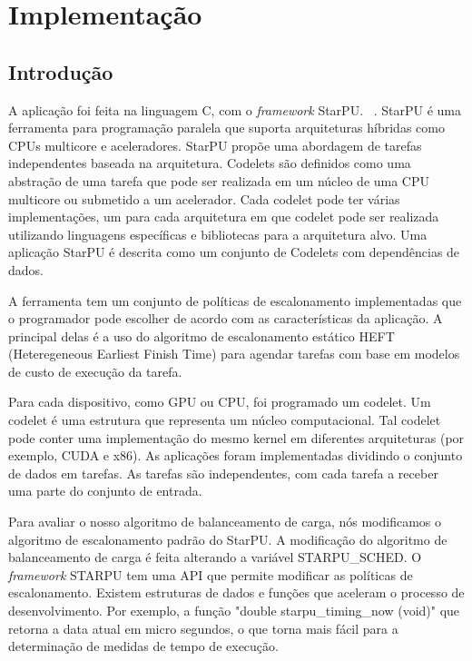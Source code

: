 \pagestyle{empty}
\cleardoublepage
\pagestyle{fancy}

\chapter{Implementação}\label{cap5}

\section{Introdução}\label{cap5:intro}

A aplicação foi feita na linguagem C, com o \emph{framework} StarPU. ~\cite{starpu}. StarPU  é uma ferramenta para programação paralela que suporta 
arquiteturas híbridas como CPUs multicore e aceleradores.  StarPU propõe 
uma abordagem de tarefas independentes baseada na arquitetura. Codelets são definidos como uma  abstração de uma tarefa que pode ser realizada em um núcleo de uma CPU multicore ou 
submetido a um acelerador. Cada codelet pode ter várias implementações, um 
para cada arquitetura em que codelet pode ser realizada utilizando linguagens específicas 
e bibliotecas para a arquitetura alvo. Uma aplicação StarPU é descrita como  
um conjunto de Codelets com dependências de dados. 

A ferramenta tem um conjunto de políticas de escalonamento implementadas que o programador pode 
escolher de acordo com as características da aplicação. A principal delas é a 
uso do algoritmo de escalonamento estático HEFT (Heteregeneous Earliest Finish Time) para 
agendar tarefas com base em modelos de custo de execução da tarefa. 

Para cada dispositivo, como GPU ou CPU, foi programado um codelet. Um codelet é uma estrutura que representa um núcleo computacional. Tal codelet pode conter uma implementação do mesmo kernel em diferentes 
arquiteturas (por exemplo, CUDA e x86). As aplicações foram implementadas  
dividindo o conjunto de dados em tarefas. As tarefas são 
independentes, com cada tarefa a receber uma parte do conjunto de entrada. 

Para avaliar o nosso algoritmo de balanceamento de carga, nós modificamos o algoritmo de escalonamento padrão do StarPU. A modificação do algoritmo de balanceamento de carga é feita alterando a variável STARPU\_SCHED. O \emph{framework} STARPU tem uma API que permite modificar as políticas de escalonamento. Existem estruturas de dados e funções que aceleram o processo de desenvolvimento. Por exemplo, a função "double starpu\_timing\_now (void)" que retorna a data atual em micro segundos, o que torna mais fácil para a determinação de medidas de tempo de execução. 

